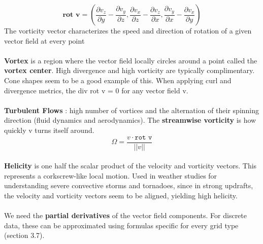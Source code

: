 \documentclass{article}
\begin{document}
\begin{equation}
    \textbf{rot v} = (\frac{\partial v_z}{\partial y} - \frac{\partial v_y}{\partial z}, \frac{\partial v_x}{\partial z} - \frac{\partial v_z}{\partial x}, \frac{\partial v_y}{\partial x} - \frac{\partial v_x}{\partial y})
\end{equation}
The vorticity vector characterizes the speed and direction of rotation of a given vector field at every point
\\\\
\textbf{Vortex} is a region where the vector field locally circles around a point called the \textbf{vortex center}. High divergence and high vorticity are typically complimentary. Cone shapes seem to be a good example of this. When applying curl and divergence metrics, the div rot v = 0 for any vector field v.
\\\\
\textbf{Turbulent Flows} : high number of vortices and the alternation of their spinning direction (fluid dynamics and aerodynamics). The \textbf{streamwise vorticity} is how quickly v turns itself around.
\begin{equation}
    \Omega = \frac{v \cdot \texttt{rot v}}{||v||}
\end{equation}
\\
\textbf{Helicity} is one half the scalar product of the velocity and vorticity vectors. This represents a corkscrew-like local motion. Used in weather studies for understanding severe convective storms and tornadoes, since in strong updrafts, the velocity and vorticity vectors seem to be aligned, yielding high helicity.
\\\\
We need the \textbf{partial derivatives} of the vector field components. For discrete data, these can be approximated using formulas specific for every grid type (section 3.7).

\end{document}
